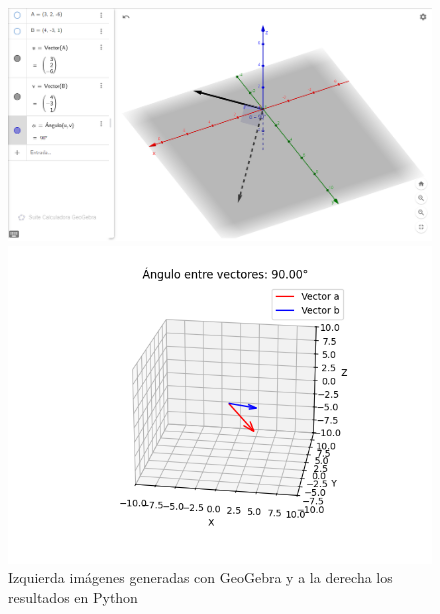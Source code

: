 \documentclass{article}
\begin{document}
\begin{figure}[h!]
    \begin{minipage}{0.45\textwidth}
        \centering
        \includegraphics[width=\textwidth]{imgs/vectores_AB_Geogebra.png}
    \end{minipage}
    \hfill
    \begin{minipage}{0.45\textwidth}
        \centering
        \includegraphics[width=\textwidth]{imgs/vectores_AB_python.png}
    \end{minipage}
    
    \caption{Izquierda imágenes generadas con GeoGebra y a la derecha los resultados en Python}
\end{figure}
\end{document}
